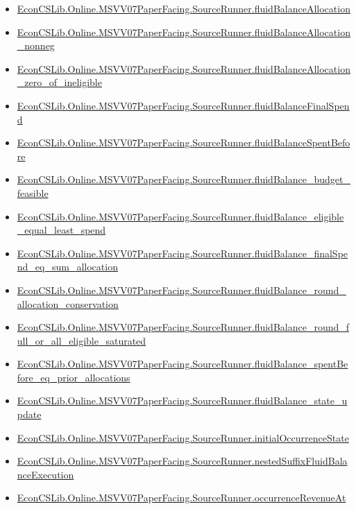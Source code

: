 \documentclass[10pt]{article}
\begin{document}
\begin{itemize}[leftmargin=1.2em]
\begin{itemize}[leftmargin=1.2em]
\item \hyperlink{library-prerequisite-0f9b66d125c74ad7}{EconCSLib.Online.MSVV07PaperFacing.SourceRunner.fluidBalanceAllocation}
\item \hyperlink{library-prerequisite-658bf6dee9966359}{EconCSLib.Online.MSVV07PaperFacing.SourceRunner.fluidBalanceAllocation\_nonneg}
\item \hyperlink{library-prerequisite-60f23ee8221e5950}{EconCSLib.Online.MSVV07PaperFacing.SourceRunner.fluidBalanceAllocation\_zero\_of\_ineligible}
\item \hyperlink{library-prerequisite-41e0e512fdc828fd}{EconCSLib.Online.MSVV07PaperFacing.SourceRunner.fluidBalanceFinalSpend}
\item \hyperlink{library-prerequisite-6ac82b36a32c812c}{EconCSLib.Online.MSVV07PaperFacing.SourceRunner.fluidBalanceSpentBefore}
\item \hyperlink{library-prerequisite-7da6f02be5c2549e}{EconCSLib.Online.MSVV07PaperFacing.SourceRunner.fluidBalance\_budget\_feasible}
\item \hyperlink{library-prerequisite-e4d4ee77b2c8d58f}{EconCSLib.Online.MSVV07PaperFacing.SourceRunner.fluidBalance\_eligible\_equal\_least\_spend}
\item \hyperlink{library-prerequisite-fd67c6cc3cddee9e}{EconCSLib.Online.MSVV07PaperFacing.SourceRunner.fluidBalance\_finalSpend\_eq\_sum\_allocation}
\item \hyperlink{library-prerequisite-d2900bb37244f244}{EconCSLib.Online.MSVV07PaperFacing.SourceRunner.fluidBalance\_round\_allocation\_conservation}
\item \hyperlink{library-prerequisite-1e244b4dce5cb5cc}{EconCSLib.Online.MSVV07PaperFacing.SourceRunner.fluidBalance\_round\_full\_or\_all\_eligible\_saturated}
\item \hyperlink{library-prerequisite-e38a203e4e9429bf}{EconCSLib.Online.MSVV07PaperFacing.SourceRunner.fluidBalance\_spentBefore\_eq\_prior\_allocations}
\item \hyperlink{library-prerequisite-e7c3f00ca4f60ac6}{EconCSLib.Online.MSVV07PaperFacing.SourceRunner.fluidBalance\_state\_update}
\item \hyperlink{library-prerequisite-7353dcebec2cdf2e}{EconCSLib.Online.MSVV07PaperFacing.SourceRunner.initialOccurrenceState}
\item \hyperlink{library-prerequisite-659e6d9960df8d14}{EconCSLib.Online.MSVV07PaperFacing.SourceRunner.nestedSuffixFluidBalanceExecution}
\item \hyperlink{library-prerequisite-c7fa52dd60e3c03f}{EconCSLib.Online.MSVV07PaperFacing.SourceRunner.occurrenceRevenueAt}

\end{itemize}
\end{itemize}
\end{document}
